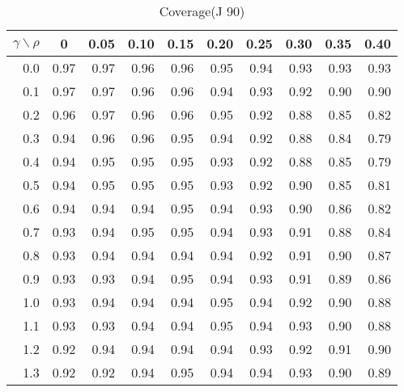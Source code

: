 \documentclass[12pt]{article}
\begin{document}
%
\begin{table}[!tbp]
\caption{Coverage(J 90)}
 \begin{center}
 \begin{tabular}{r|rrrrrrrrr}\hline\hline
\multicolumn{1}{c|}{$\gamma\backslash\rho$}&\multicolumn{1}{c}{0}&\multicolumn{1}{c}{0.05}&\multicolumn{1}{c}{0.10}&\multicolumn{1}{c}{0.15}&\multicolumn{1}{c}{0.20}&\multicolumn{1}{c}{0.25}&\multicolumn{1}{c}{0.30}&\multicolumn{1}{c}{0.35}&\multicolumn{1}{c}{0.40}\tabularnewline
\hline

0.0&0.97&0.97&0.96&0.96&0.95&0.94&0.93&0.93&0.93\tabularnewline
0.1&0.97&0.97&0.96&0.96&0.94&0.93&0.92&0.90&0.90\tabularnewline
0.2&0.96&0.97&0.96&0.96&0.95&0.92&0.88&0.85&0.82\tabularnewline
0.3&0.94&0.96&0.96&0.95&0.94&0.92&0.88&0.84&0.79\tabularnewline
0.4&0.94&0.95&0.95&0.95&0.93&0.92&0.88&0.85&0.79\tabularnewline
0.5&0.94&0.95&0.95&0.95&0.93&0.92&0.90&0.85&0.81\tabularnewline
0.6&0.94&0.94&0.94&0.95&0.94&0.93&0.90&0.86&0.82\tabularnewline
0.7&0.93&0.94&0.95&0.95&0.94&0.93&0.91&0.88&0.84\tabularnewline
0.8&0.93&0.94&0.94&0.94&0.94&0.92&0.91&0.90&0.87\tabularnewline
0.9&0.93&0.93&0.94&0.95&0.94&0.93&0.91&0.89&0.86\tabularnewline
1.0&0.93&0.94&0.94&0.94&0.95&0.94&0.92&0.90&0.88\tabularnewline
1.1&0.93&0.93&0.94&0.94&0.95&0.94&0.93&0.90&0.88\tabularnewline
1.2&0.92&0.94&0.94&0.94&0.94&0.93&0.92&0.91&0.90\tabularnewline
1.3&0.92&0.92&0.94&0.95&0.94&0.94&0.93&0.90&0.89\tabularnewline
\hline
\end{tabular}

\end{center}

\end{table}
\end{document}
